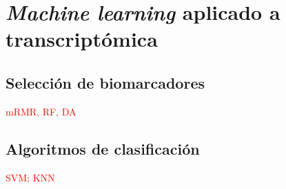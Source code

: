 \chapter{\textit{Machine learning} aplicado a transcriptómica}

\section{Selección de biomarcadores}

\textcolor{red}{mRMR, RF, DA}

\section{Algoritmos de clasificación}

\textcolor{red}{SVM; KNN}
